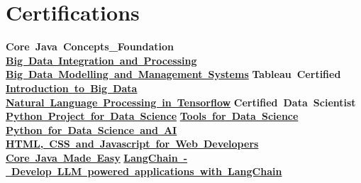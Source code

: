 \documentclass[letterpaper,10pt]{article}
\begin{document}
\section{Certifications}

{\footnotesize
\begin{adjustwidth}{0.15in}{0pt}
\setlength{\parindent}{0em}
\mbox{\textbf{Core Java Concepts\_Foundation}}\hspace{1.5em}%
\mbox{\textbf{\href{https://www.coursera.org/account/accomplishments/verify/G5X2LDN5O6EM}{Big Data Integration and Processing}}}\hspace{1.5em}%
\mbox{\textbf{\href{https://www.coursera.org/account/accomplishments/verify/KV88FOJZTXPH}{Big Data Modelling and Management Systems}}}\hspace{1.5em}%
\mbox{\textbf{Tableau Certified}}\hspace{1.5em}%
\mbox{\textbf{\href{https://www.coursera.org/account/accomplishments/verify/MKX4YAI6UWYS}{Introduction to Big Data}}}\hspace{1.5em}%
\mbox{\textbf{\href{https://www.coursera.org/account/accomplishments/verify/VXQVKA4P23K3}{Natural Language Processing in Tensorflow}}}\hspace{1.5em}%
\mbox{\textbf{Certified Data Scientist}}\hspace{1.5em}%
\mbox{\textbf{\href{https://www.coursera.org/account/accomplishments/verify/UTTAJXMGMUAZ}{Python Project for Data Science}}}\hspace{1.5em}%
\mbox{\textbf{\href{https://www.coursera.org/account/accomplishments/verify/883VQZ844SQ6}{Tools for Data Science}}}\hspace{1.5em}%
\mbox{\textbf{\href{https://www.credly.com/badges/9508ddfe-966f-4d39-8ad2-e789dac34020/linked_in_profile}{Python for Data Science and AI}}}\hspace{1.5em}%
\mbox{\textbf{\href{https://www.coursera.org/account/accomplishments/verify/WA8EMJSPSQBB}{HTML, CSS and Javascript for Web Developers}}}\hspace{1.5em}%
\mbox{\textbf{\href{https://tcsglobal.udemy.com/certificate/UC-0dbcb04b-4702-489e-800f-75f466099169/?utm_campaign=email&utm_medium=email&utm_source=sendgrid.com}{Core Java Made Easy}}}\hspace{1.5em}%
\mbox{\textbf{\href{https://www.udemy.com/certificate/UC-2bed0a6f-8730-42e4-a864-54b59ce50535/}{LangChain - Develop LLM powered applications with LangChain}}}
\end{adjustwidth}
}
\normalsize
\end{document}
